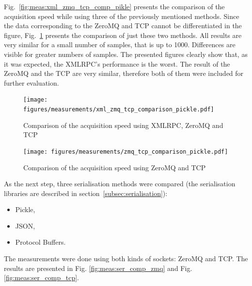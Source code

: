         Fig.~\ref{fig:meas:xml_zmq_tcp_comp_pikle} presents the comparison of the acquisition speed while using three of the previously mentioned methods. Since the data corresponding to the ZeroMQ and TCP cannot be differentiated in the figure, Fig.~\ref{fig:meas:zmq_tcp_comp_pikle} presents the comparison of just these two methods. 
        All results are very similar for a small number of samples, that is up to 1000. Differences are visible for greater numbers of samples. The presented figures clearly show that, as it was expected, the XMLRPC's performance is the worst. The result of the ZeroMQ and the TCP are very similar, therefore both of them were included for further evaluation.
        
        \begin{figure}
            \centering
            \begin{minipage}[b]{0.8\textwidth}
                \texttt{[image: figures/measurements/xml\_zmq\_tcp\_comparison\_pickle.pdf]}
            	\caption{Comparison of the acquisition speed using XMLRPC, ZeroMQ and TCP}
                \label{fig:meas:xml_zmq_tcp_comp_pikle}
            \end{minipage}
            \vfill
            \vspace{1cm}
            \begin{minipage}[b]{0.8\textwidth}
                \texttt{[image: figures/measurements/zmq\_tcp\_comparison\_pickle.pdf]}
            	\caption{Comparison of the acquisition speed using ZeroMQ and TCP}
                \label{fig:meas:zmq_tcp_comp_pikle}
            \end{minipage}
        \end{figure}
        
        As the next step, three serialisation methods were compared (the serialisation libraries are described in section~\ref{subsec:serialisation}):
        \begin{itemize}
            \item Pickle,
            \item JSON,
            \item Protocol Buffers.
        \end{itemize}
        
        The measurements were done using both kinds of sockets: ZeroMQ and TCP. The results are presented in Fig. \ref{fig:meas:ser_comp_zmq} and Fig. \ref{fig:meas:ser_comp_tcp}.
        
